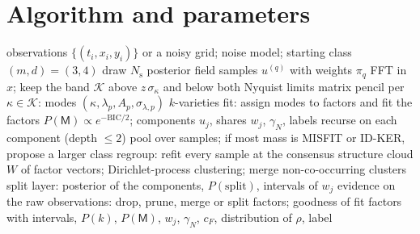 \documentclass[11pt]{article}
\theoremstyle{plain}
\theoremstyle{definition}
\theoremstyle{remark}
\newcommand{\cF}{c_{F}}                     %
\newcommand{\gN}{\gamma_{N}}                %
\newcommand{\sigbin}{\sigma_{\kappa}}       %
\newcommand{\Nsamp}{N_{\mathrm s}}          %
\newcommand{\cloud}{W}                      %
\newcommand{\Mfit}{\mathsf{M}}              %
\newcommand{\lab}[1]{\textsf{#1}}           %
\newcommand{\IDK}{\lab{ID-KER}}
\newcommand{\MIS}{\lab{MISFIT}}
\begin{document}
\section{Algorithm and parameters}\label{app:algo}
\begin{algorithm}[htbp]
\caption{Grouping-based identification of a constant-coefficient PDE}\label{alg:full}
\begin{algorithmic}[1]
\Require observations $\{(t_i,x_i,y_i)\}$ or a noisy grid; noise model; starting class $(m,d)=(3,4)$
\State draw $\Nsamp$ posterior field samples $u^{(q)}$ with weights $\pi_q$ 
\Repeat {}
    \State FFT in $x$; keep the band $\mathcal K$ above $z\,\sigbin$ and below both Nyquist limits 
    \State matrix pencil per $\kappa\in\mathcal K$: modes $(\kappa,\lambda_p,A_p,\sigma_{\lambda,p})$ 
    \For{each structure $\Mfit\in\mathcal C(m,d)$}
      \State $k$-varieties fit: assign modes to factors and fit the factors 
    \EndFor
    \State $P(\Mfit)\propto e^{-\mathrm{BIC}/2}$; components $u_j$, shares $w_j$, $\gN$, labels 
    \State recurse on each component (depth $\le2$) 
  \EndFor
  \State pool over samples; if most mass is \MIS{} or \IDK, propose a larger class
\State regroup: refit every sample at the consensus structure
\State cloud $\cloud$ of factor vectors; Dirichlet-process clustering; merge non-co-occurring clusters 
\State split layer: posterior of the components, $P(\text{split})$, intervals of $w_j$ 
\State evidence on the raw observations: drop, prune, merge or split factors; goodness of fit 
\State \Return factors with intervals, $P(k)$, $P(\Mfit)$, $w_j$, $\gN$, $\cF$, distribution of $\rho$, label
\end{algorithmic}
\end{algorithm}
\end{document}
